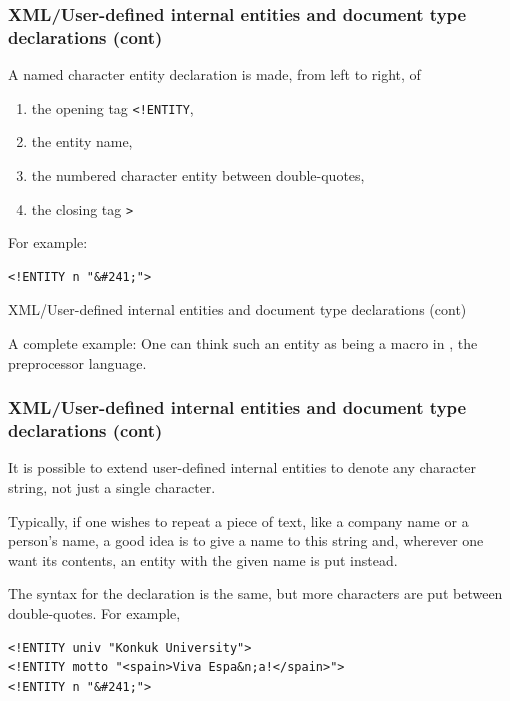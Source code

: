 %
\begin{frame}[containsverbatim]
\frametitle{XML/User-defined internal entities and document type declarations (cont)}

A named character entity declaration is made, from left to right, of
\begin{enumerate}

  \item the opening tag \verb|<!ENTITY|,

  \item the entity name,

  \item the numbered character entity between double-quotes,

  \item the closing tag \verb|>|

\end{enumerate}
For example:
\begin{verbatim}
<!ENTITY n "&#241;">
\end{verbatim}

\end{frame}

%
\begin{frame}{XML/User-defined internal entities and document type declarations (cont)}

A complete example:
One can think such an entity as being a macro in \Cpp, the \Clang
preprocessor language.

\end{frame}

%
\begin{frame}[containsverbatim]
\frametitle{XML/User-defined internal entities and document type declarations (cont)}

It is possible to extend user-defined internal entities to denote any
character string, not just a single character.

\bigskip

Typically, if one wishes to repeat a piece of text, like a company
name or a person's name, a good idea is to give a name to this string
and, wherever one want its contents, an entity with the given name is
put instead.

\bigskip

The syntax for the declaration is the same, but more characters are
put between double-quotes. For example,
\begin{verbatim}
<!ENTITY univ "Konkuk University">
<!ENTITY motto "<spain>Viva Espa&n;a!</spain>">
<!ENTITY n "&#241;">
\end{verbatim}

\end{frame}

